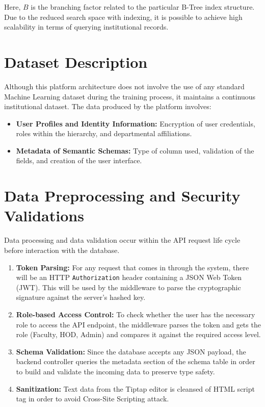 \documentclass[conference]{IEEEtran}
\begin{document}
Here, $B$ is the branching factor related to the particular B-Tree index structure. Due to the reduced search space with indexing, it is possible to achieve high scalability in terms of querying institutional records.

\section{Dataset Description}
Although this platform architecture does not involve the use of any standard Machine Learning dataset during the training process, it maintains a continuous institutional dataset. The data produced by the platform involves:
\begin{itemize}
    \item \textbf{User Profiles and Identity Information:} Encryption of user credentials, roles within the hierarchy, and departmental affiliations.
    \item \textbf{Metadata of Semantic Schemas:} Type of column used, validation of the fields, and creation of the user interface.
\end{itemize}

\section{Data Preprocessing and Security Validations}
Data processing and data validation occur within the API request life cycle before interaction with the database.
\begin{enumerate}
    \item \textbf{Token Parsing:} For any request that comes in through the system, there will be an HTTP \texttt{Authorization} header containing a JSON Web Token (JWT). This will be used by the middleware to parse the cryptographic signature against the server's hashed key.
    \item \textbf{Role-based Access Control:} To check whether the user has the necessary role to access the API endpoint, the middleware parses the token and gets the role (Faculty, HOD, Admin) and compares it against the required access level.
    \item \textbf{Schema Validation:} Since the database accepts any JSON payload, the backend controller queries the metadata section of the schema table in order to build and validate the incoming data to preserve type safety.
    \item \textbf{Sanitization:} Text data from the Tiptap editor is cleansed of HTML script tag in order to avoid Cross-Site Scripting attack.
\end{enumerate}
\end{document}
